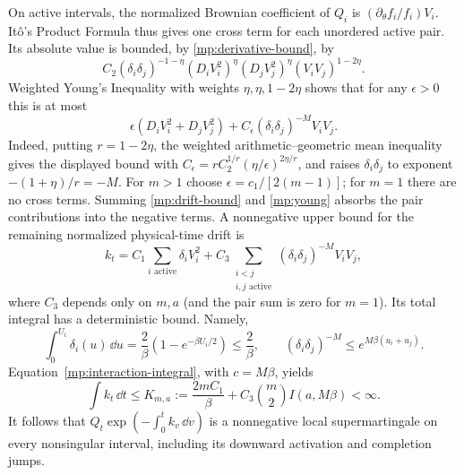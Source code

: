 On active intervals, the normalized
Brownian coefficient of $Q_i$ is
$(\partial_\theta f_i/f_i)V_i$. It\^o's Product Formula thus gives
one cross term for each unordered active pair. Its absolute value is
bounded, by \eqref{mp:derivative-bound}, by
\[
 C_2(\delta_i\delta_j)^{-1-\eta}
    (D_iV_i^2)^\eta(D_jV_j^2)^\eta(V_iV_j)^{1-2\eta}.
\]
Weighted Young's Inequality with weights $\eta,\eta,1-2\eta$ shows
that for any $\epsilon>0$ this is at most
\begin{equation}
 \epsilon(D_iV_i^2+D_jV_j^2)
       +C_\epsilon(\delta_i\delta_j)^{-M}V_iV_j.
 \label{mp:young}
\end{equation}
Indeed, putting $r=1-2\eta$, the weighted arithmetic--geometric
mean inequality gives the displayed bound with
$C_\epsilon=rC_2^{1/r}(\eta/\epsilon)^{2\eta/r}$, and raises
$\delta_i\delta_j$ to exponent $-(1+\eta)/r=-M$.
For $m>1$ choose $\epsilon=c_1/[2(m-1)]$; for $m=1$ there are no
cross terms. Summing \eqref{mp:drift-bound} and \eqref{mp:young}
absorbs the pair contributions into the negative terms. A nonnegative
upper bound for the remaining normalized physical-time drift is
\[
 k_t=C_1\sum_{i\text{ active}}\delta_iV_i^2
       +C_3\sum_{\substack{i<j\\i,j\text{ active}}}
                     (\delta_i\delta_j)^{-M}V_iV_j,
\]
where $C_3$ depends only on $m,a$ (and the pair sum is zero for $m=1$).
Its total integral has a deterministic bound. Namely,
\[
 \int_0^{U_i}\delta_i(u)\,\dd u
 =\frac2\beta(1-e^{-\beta U_i/2})\le\frac2\beta,
 \qquad
 (\delta_i\delta_j)^{-M}\le e^{M\beta(u_i+u_j)}.
\]
Equation~\eqref{mp:interaction-integral}, with $c=M\beta$, yields
\begin{equation}
 \int k_t\,\dd t\le
 K_{m,a}:=\frac{2mC_1}{\beta}
             +C_3\binom m2 I(a,M\beta)<\infty.
 \label{mp:discount}
\end{equation}
It follows that
$Q_t\exp(-\int_0^t k_v\,\dd v)$ is a nonnegative local
supermartingale on every nonsingular interval, including its downward
activation and completion jumps.

